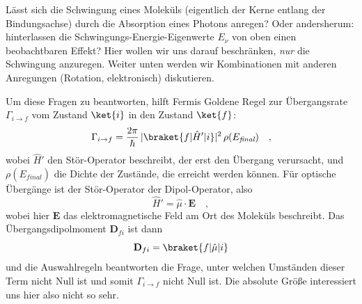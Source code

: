 Lässt sich die Schwingung eines Moleküls (eigentlich der Kerne entlang der Bindungsachse) durch die Absorption eines Photons anregen? Oder andersherum: hinterlassen die Schwingungs-Energie-Eigenwerte $E_\nu$ von oben einen beobachtbaren Effekt? Hier wollen wir uns darauf beschränken, \emph{nur} die Schwingung anzuregen. Weiter unten werden wir Kombinationen mit anderen Anregungen (Rotation, elektronisch) diskutieren.

Um diese Fragen zu beantworten, hilft Fermis Goldene Regel zur Übergangsrate $\Gamma_{i \rightarrow f}$ vom Zustand $\ket{i}$ in den Zustand $\ket{f}$:
\begin{equation}
\Gamma_{i \rightarrow f} = \frac{2 \pi}{\hbar} \, |\braket{f | \hat{H}' | i} |^2 \, \rho(E_\textit{final}) \quad ,
\end{equation}
wobei $\hat{H}'$ den Stör-Operator beschreibt, der erst den Übergang verursacht, und $ \rho(E_\textit{final})$ die Dichte der Zustände, die erreicht werden können. Für optische Übergänge ist der Stör-Operator der Dipol-Operator, also
\begin{equation}
\hat{H}' = \hat{\mu} \cdot \mathbf{E} \quad ,
\end{equation}
wobei hier $\mathbf{E}$ das elektromagnetische Feld am Ort des Moleküls beschreibt. Das Übergangsdipolmoment $\mathbf{D}_{fi}$ ist dann 
\begin{equation}
 \mathbf{D}_{fi} = \braket{f | \hat{\mu} | i} 
\end{equation}
und die Auswahlregeln beantworten die Frage, unter welchen Umständen dieser Term nicht Null ist und somit $\Gamma_{i \rightarrow f} $ nicht Null ist. Die absolute Größe interessiert uns hier also nicht so sehr.

